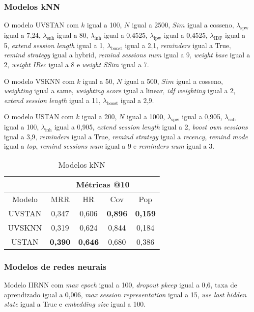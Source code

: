 \subsubsection{Modelos kNN}
O modelo UVSTAN com $k$ igual a 100, $N$ igual a 2500, $Sim$ igual a cosseno,
$\lambda_{\text{spw}}$ igual a 7,24, $\lambda_{\text{snh}}$ igual a 80,
$\lambda_{\text{inh}}$ igual a 0,4525, $\lambda_{\text{ipw}}$ igual a 0,4525,
$\lambda_{\text{IDF}}$ igual a 5, \textit{extend session length} igual a 1,
$\lambda_{\text{boost}}$ igual a 2,1, \textit{reminders} igual a True,
\textit{remind strategy} igual a hybrid, \textit{remind sessions num} igual a 9,
\textit{weight base} igual a 2, \textit{weight IRec} igual a 8 e \textit{weight
SSim} igual a 7.

O modelo VSKNN com $k$ igual a 50, $N$ igual a 500, $Sim$ igual a cosseno,
\textit{weighting} igual a same, \textit{weighting score} igual a linear,
\textit{idf weighting} igual a 2, \textit{extend session length} igual a 11,
$\lambda_{\text{boost}}$ igual a 2,9.

O modelo USTAN com $k$ igual a 200, $N$ igual a 1000, $\lambda_{\text{spw}}$
igual a 0,905, $\lambda_{\text{snh}}$ igual a 100, $\lambda_{\text{inh}}$ igual a
0,905, \textit{extend session length} igual a 2, \textit{boost own sessions}
igual a 3,9, \textit{reminders} igual a True, \textit{remind strategy} igual a
\textit{recency}, \textit{remind mode} igual a \textit{top}, \textit{remind
sessions num} igual a 9 e \textit{reminders num} igual a 3.

\begin{table}[htbp]
  \centering
  \begin{tabular}{|c|c|c|c|c|}
      \hline
      \multicolumn{1}{|c|}{} & \multicolumn{4}{c|}{Métricas @10} \\
      \hline
      Modelo & MRR & HR & Cov & Pop \\
      \hline
      UVSTAN & 0,347 & 0,606 & \textbf{0,896} & \textbf{0,159} \\
      \hline
      UVSKNN & 0,319 & 0,624 & 0,844 & 0,184 \\
      \hline
      USTAN & \textbf{0,390} & \textbf{0,646} & 0,680 & 0,386 \\
      \hline
      \end{tabular}
      \caption{Modelos kNN}
\end{table}



\subsubsection{Modelos de redes neurais}
Modelo IIRNN com \textit{max epoch} igual a 100, \textit{dropout pkeep} igual a
0,6, taxa de aprendizado igual a 0,006, \textit{max session representation} igual
a 15, \textit{use last hidden state} igual a True e \textit{embedding size} igual
a 100.

